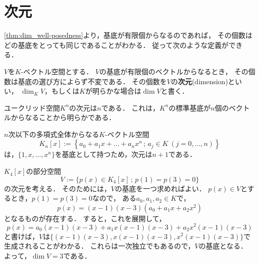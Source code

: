 \section{次元}
\cref{thm:dim_well-posedness}より，基底が有限個からなるのであれば，
その個数はどの基底をとっても同じであることがわかる．
従って次のような定義ができる．
\begin{dfn}
  $V$を$K$-ベクトル空間とする．
  $V$の基底が有限個のベクトルからなるとき，
  その個数は基底の選び方によらず不変である．
  その個数を$V$の\textbf{次元}(dimension)といい，
  $\dim_K V$，もしくは$K$が明らかな場合は$\dim V$と書く．
\end{dfn}
\begin{example}
  ユークリッド空間$K^n$の次元は$n$である．
  これは，$K^n$の標準基底が$n$個のベクトルからなることから明らかである．
\end{example}
\begin{example}
  $n$次以下の多項式全体からなる$K$-ベクトル空間
  \[
    K_n[x] := \left\{ a_0 + a_1 x + \dots + a_n x^n \,;\, a_j \in K\ (j=0,\dots,n) \right\} 
  \]
  は，$\{1,x,\dots,x^n\}$を基底として持つため，次元は$n+1$である．
\end{example}
\begin{example}
  $K_4[x]$の部分空間
  \[
    V := \{p(x) \in K_4[x] \,;\, p(1)=p(3)=0\}  
  \]
  の次元を考える．
  そのためには，$V$の基底を一つ求めればよい．
  $p(x) \in V$とするとき，$p(1)=p(3)=0$なので，
  ある$a_0,a_1,a_2 \in K$で，
  \[
    p(x) = (x-1)(x-3)(a_0 + a_1 x + a_2 x^2)  
  \]
  となるものが存在する．
  すると，これを展開して，
  \[
    p(x) = a_0 (x-1)(x-3) + a_1 x (x-1)(x-3) + a_2 x^2 (x-1)(x-3)  
  \]
  と書けば，$V$は$\{(x-1)(x-3), x(x-1)(x-3), x^2(x-1)(x-3)\}$で生成されることがわかる．
  これらは一次独立でもあるので，$V$の基底となる．
  よって，$\dim V = 3$である．
\end{example}
